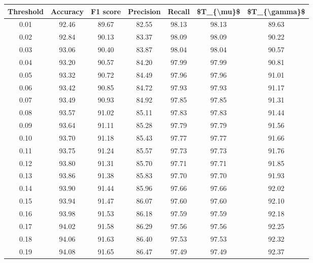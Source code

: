 \begin{tabular}{|c|c|c|c|c|c|c|}
\hline
 Threshold &  Accuracy &  F1 score &  Precision &  Recall &  \$T\_\{\textbackslash mu\}\$ &  \$T\_\{\textbackslash gamma\}\$ \\
\hline
      0.01 &     92.46 &     89.67 &      82.55 &   98.13 &      98.13 &         89.63 \\
      0.02 &     92.84 &     90.13 &      83.37 &   98.09 &      98.09 &         90.22 \\
      0.03 &     93.06 &     90.40 &      83.87 &   98.04 &      98.04 &         90.57 \\
      0.04 &     93.20 &     90.57 &      84.20 &   97.99 &      97.99 &         90.81 \\
      0.05 &     93.32 &     90.72 &      84.49 &   97.96 &      97.96 &         91.01 \\
      0.06 &     93.42 &     90.85 &      84.72 &   97.93 &      97.93 &         91.17 \\
      0.07 &     93.49 &     90.93 &      84.92 &   97.85 &      97.85 &         91.31 \\
      0.08 &     93.57 &     91.02 &      85.11 &   97.83 &      97.83 &         91.44 \\
      0.09 &     93.64 &     91.11 &      85.28 &   97.79 &      97.79 &         91.56 \\
      0.10 &     93.70 &     91.18 &      85.43 &   97.77 &      97.77 &         91.66 \\
      0.11 &     93.75 &     91.24 &      85.57 &   97.73 &      97.73 &         91.76 \\
      0.12 &     93.80 &     91.31 &      85.70 &   97.71 &      97.71 &         91.85 \\
      0.13 &     93.86 &     91.38 &      85.83 &   97.70 &      97.70 &         91.93 \\
      0.14 &     93.90 &     91.44 &      85.96 &   97.66 &      97.66 &         92.02 \\
      0.15 &     93.94 &     91.47 &      86.07 &   97.60 &      97.60 &         92.10 \\
      0.16 &     93.98 &     91.53 &      86.18 &   97.59 &      97.59 &         92.18 \\
      0.17 &     94.02 &     91.58 &      86.29 &   97.56 &      97.56 &         92.25 \\
      0.18 &     94.06 &     91.63 &      86.40 &   97.53 &      97.53 &         92.32 \\
      0.19 &     94.08 &     91.65 &      86.47 &   97.49 &      97.49 &         92.37 \\

\end{tabular}

